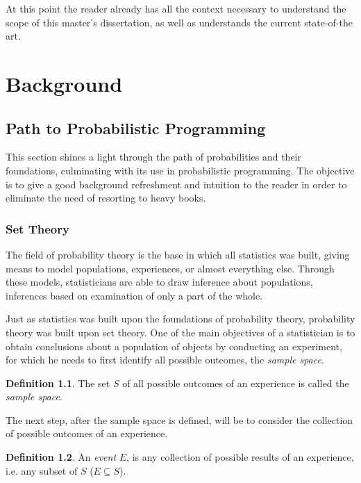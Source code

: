 \documentclass[
  oneside,
  11pt, a4paper,
  footinclude=true,
  headinclude=true,
  cleardoublepage=empty
]{scrbook}
\theoremstyle{definition}
\newtheorem{definition}{Definition}[section]
\theoremstyle{definition}
\begin{document}
    At this point the reader already has all the context necessary to understand the scope of this master's dissertation, as well as understands the current state-of-the art.
    
    \chapter{Background}\label{ch-background}
    
        \section{Path to Probabilistic Programming}\label{s-2-2}
    
        This section shines a light through the path of probabilities and their foundations, culminating with its use in probabilistic programming. The objective is to give a good background refreshment and intuition to the reader in order to eliminate the need of resorting to heavy books.
        
        \subsection{Set Theory}
        
            The field of probability theory is the base in which all statistics was built, giving means to model populations, experiences, or almost everything else. Through these models, statisticians are able to draw inference about populations, inferences based on examination of only a part of the whole.
            
            Just as statistics was built upon the foundations of probability theory, probability theory was built upon set theory. One of the main objectives of a statistician is to obtain conclusions about a population of objects by conducting an experiment, for which he needs to first identify all possible outcomes, the \emph{sample space}.
            
            \begin{definition}{}
                The set $S$ of all possible outcomes of an experience is called the \emph{sample space}.
            \end{definition}
            
            The next step, after the sample space is defined, will be to consider the collection of possible outcomes of an experience.
            
            \begin{definition}{}
                An \emph{event} $E$, is any collection of possible results of an experience, i.e. any subset of $S$ ($E \subseteq S$).
            \end{definition}
            
\end{document}
